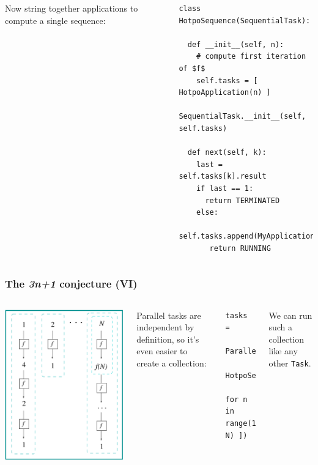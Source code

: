 \documentclass[presentation]{beamer}
\begin{document}
\begin{frame}[fragile]
\begin{columns}
  Now string together applications to compute a
  single sequence:
\begin{lstlisting}
class HotpoSequence(SequentialTask):

  def __init__(self, n):
    # compute first iteration of $f$
    self.tasks = [ HotpoApplication(n) ]
    SequentialTask.__init__(self, self.tasks)

  def next(self, k):
    last = self.tasks[k].result
    if last == 1:
      return TERMINATED
    else:
      self.tasks.append(MyApplication(last)
       return RUNNING
\end{lstlisting}
  \end{columns}
\end{frame}

\begin{frame}[fragile]
  \frametitle{The \emph{3n+1} conjecture (VI)}
  \label{sec:15}

  \begin{columns}
    \begin{center}
      \includegraphics[height=0.8\textheight]{3n+1_P}
    \end{center}

    Parallel tasks are independent by definition, so it's even easier to
    create a collection:
\begin{lstlisting}
tasks = 
  ParallelTaskCollection([ 
    HotpoSequence(n) 
      for n in range(1, N) ])
\end{lstlisting}
  
    We can run such a collection like any other \texttt{Task}.
  \end{columns}
\end{frame}
\end{document}
